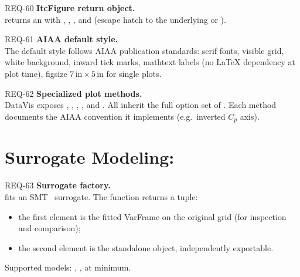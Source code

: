 \begin{reqbox}{REQ-60}{\stable}
\textbf{ItcFigure return object.}\\
 returns an  with
, ,
, and  (escape hatch to the underlying
 or ).
\end{reqbox}

\begin{reqbox}{REQ-61}{\stable}
\textbf{AIAA default style.}\\
The default style follows AIAA publication standards: serif fonts,
visible grid, white background, inward tick marks, mathtext labels (no
LaTeX dependency at plot time), figsize $7\,\text{in}\times 5\,\text{in}$
for single plots.
\end{reqbox}

\begin{reqbox}{REQ-62}{\stable}
\textbf{Specialized plot methods.}\\
DataVis exposes , ,
, , and
. All inherit the full option set of
. Each method documents the AIAA convention it implements
(e.g.\ inverted $C_p$ axis).
\end{reqbox}

\section{Surrogate Modeling: }

\begin{reqbox}{REQ-63}{\stable}
\textbf{Surrogate factory.}\\
 fits an SMT~\citep{smt} surrogate. The function
returns a tuple:
\begin{itemize}[noitemsep,topsep=2pt]
  \item the first element is the fitted VarFrame on the original grid
    (for inspection and comparison);
  \item the second element is the standalone  object,
    independently exportable.
\end{itemize}
Supported models: , ,  at minimum.
\end{reqbox}

